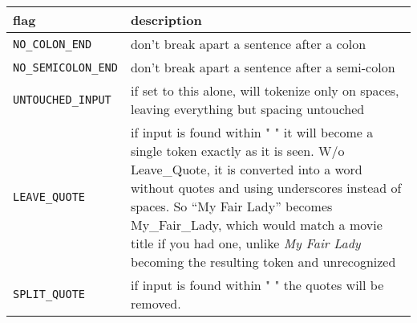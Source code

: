 \documentclass[]{article}
\begin{document}
\begin{longtable}[]{@{}ll@{}}
\toprule
\begin{minipage}[b]{0.07\columnwidth}\raggedright\strut
flag\strut
\end{minipage} & \begin{minipage}[b]{0.10\columnwidth}\raggedright\strut
description\strut
\end{minipage}\tabularnewline
\midrule
\endhead
\begin{minipage}[t]{0.07\columnwidth}\raggedright\strut
\texttt{NO\_COLON\_END}\strut
\end{minipage} & \begin{minipage}[t]{0.10\columnwidth}\raggedright\strut
don't break apart a sentence after a colon\strut
\end{minipage}\tabularnewline
\begin{minipage}[t]{0.07\columnwidth}\raggedright\strut
\texttt{NO\_SEMICOLON\_END}\strut
\end{minipage} & \begin{minipage}[t]{0.10\columnwidth}\raggedright\strut
don't break apart a sentence after a semi-colon\strut
\end{minipage}\tabularnewline
\begin{minipage}[t]{0.07\columnwidth}\raggedright\strut
\texttt{UNTOUCHED\_INPUT}\strut
\end{minipage} & \begin{minipage}[t]{0.10\columnwidth}\raggedright\strut
if set to this alone, will tokenize only on spaces, leaving everything
but spacing untouched\strut
\end{minipage}\tabularnewline
\begin{minipage}[t]{0.07\columnwidth}\raggedright\strut
\texttt{LEAVE\_QUOTE}\strut
\end{minipage} & \begin{minipage}[t]{0.10\columnwidth}\raggedright\strut
if input is found within " " it will become a single token exactly as it
is seen. W/o Leave\_Quote, it is converted into a word without quotes
and using underscores instead of spaces. So ``My Fair Lady'' becomes
My\_Fair\_Lady, which would match a movie title if you had one, unlike
\emph{My Fair Lady} becoming the resulting token and unrecognized\strut
\end{minipage}\tabularnewline
\begin{minipage}[t]{0.07\columnwidth}\raggedright\strut
\texttt{SPLIT\_QUOTE}\strut
\end{minipage} & \begin{minipage}[t]{0.10\columnwidth}\raggedright\strut
if input is found within " " the quotes will be removed.\strut
\end{minipage}\tabularnewline
\bottomrule
\end{longtable}
\end{document}
